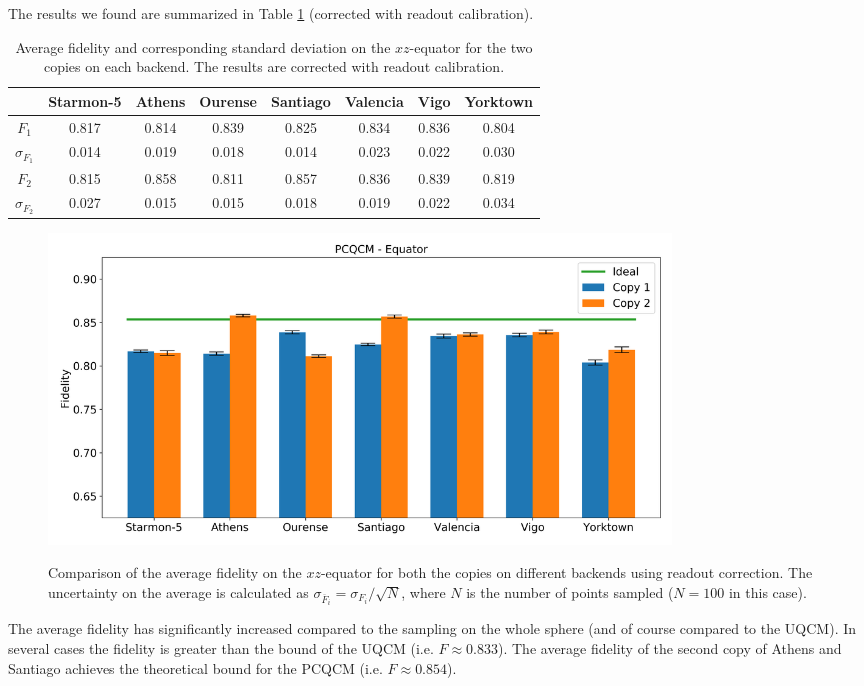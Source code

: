 The results we found are summarized in Table \ref{tab:results_pcqcm_onlyequator_corrected} (corrected with readout calibration).
\begin{table}[H]
    \centering
    \begin{tabular}{|c|c|c|c|c|c|c|c|}
    \hline
    \textbf{} & \textbf{Starmon-5} & \textbf{Athens} & \textbf{Ourense} & \textbf{Santiago} & \textbf{Valencia} & \textbf{Vigo} & \textbf{Yorktown} \\ \hline
    $F_1$              & 0.817 & 0.814 & 0.839 & 0.825 & 0.834 & 0.836 & 0.804 \\ \hline
    $\sigma_{F_1}$     & 0.014 & 0.019 & 0.018 & 0.014 & 0.023 & 0.022 & 0.030 \\ \hline
    $F_2$              & 0.815 & 0.858 & 0.811 & 0.857 & 0.836 & 0.839 & 0.819 \\ \hline
    $\sigma_{F_2}$     & 0.027 & 0.015 & 0.015 & 0.018 & 0.019 & 0.022 & 0.034 \\ \hline
    \end{tabular}
    \caption{Average fidelity and corresponding standard deviation on the $xz$-equator for the two copies on each backend. The results are corrected with readout calibration.}
    \label{tab:results_pcqcm_onlyequator_corrected}
\end{table}
\begin{figure}[H]
  \centering
          \includegraphics[width=0.8\textwidth]{Figures/PhaseCovariant/Histograms/histo_equator_corrected.png}
      \label{fig:pc_histo_equator_corrected}
      \caption{Comparison of the average fidelity on the $xz$-equator for both the copies on different backends using readout correction. The uncertainty on the average is calculated as $\sigma_{\overline{F}_i}=\sigma_{F_i}/\sqrt{N}$, where $N$ is the number of points sampled ($N=100$ in this case).}
\end{figure}
The average fidelity has significantly increased compared to the sampling on the whole sphere (and of course compared to the UQCM).
In several cases the fidelity is greater than the bound of the UQCM (i.e. $F\approx 0.833$). 
The average fidelity of the second copy of Athens and Santiago achieves the theoretical bound for the PCQCM (i.e. $F\approx 0.854$).

